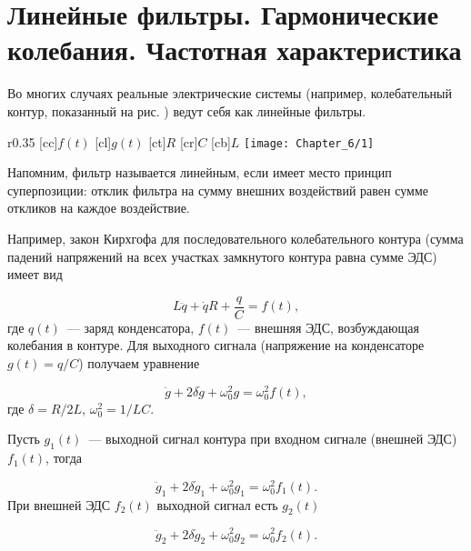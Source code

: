 
\section{Линейные фильтры. Гармонические колебания. Частотная характеристика}



Во многих случаях реальные электрические системы (например, колебательный контур, показанный на рис. ) ведут себя как
линейные фильтры.

\begin{wrapfigure}[24]{r}{0.35\textwidth}
	[cc]{$f(t)$}
	[cl]{$g(t)$}
	[ct]{$R$}
	[cr]{$C$}
	[cb]{$L$}
	\texttt{[image: Chapter\_6/1]}
	\caption{}
\end{wrapfigure}

Напомним, фильтр называется линейным, если имеет место принцип суперпозиции: отклик фильтра на сумму внешних воздействий
равен сумме откликов на каждое воздействие.

Например, закон Кирхгофа для последовательного колебательного контура (сумма падений напряжений на всех участках
замкнутого контура равна сумме ЭДС) имеет вид

\begin{equation*}
	L\ddot{q}+\dot{q}R+\frac{q}{C}=f(t),
\end{equation*}
где $q(t)$~--- заряд конденсатора, $f(t)$~--- внешняя ЭДС, возбуждающая колебания в контуре. Для выходного сигнала
(напряжение на конденсаторе $g(t)=q/C$) получаем уравнение

\begin{equation*}
	\ddot{g}+2\delta\dot{g}+\omega_0^2 g=\omega_0^2 f(t),
\end{equation*}
где $\delta=R/2L$, $\omega_0^2=1/LC$.

Пусть $g_1(t)$~--- выходной сигнал контура при входном сигнале (внешней ЭДС) $f_1(t)$, тогда

\begin{equation*}
	\ddot{g}_1+2\delta \dot{g}_1 +\omega_0^2 g_1=\omega_0^2 f_1(t).
\end{equation*}
При внешней ЭДС $f_2(t)$ выходной сигнал есть $g_2(t)$

\begin{equation*}
	\ddot{g}_2+2\delta \dot{g}_2+\omega_0^2g_2=\omega_0^2 f_2(t).
\end{equation*}

